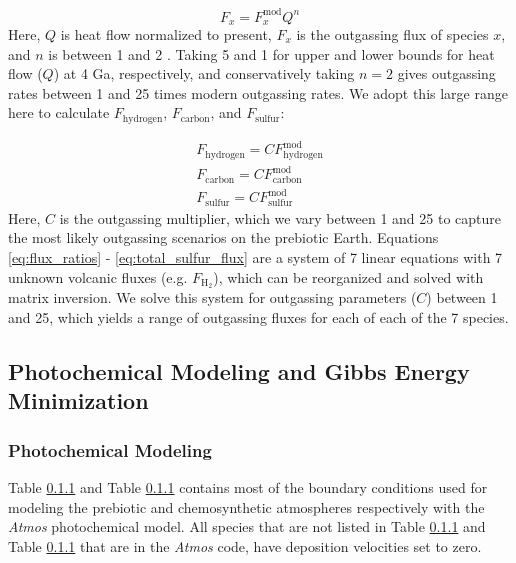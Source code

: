 \begin{equation}
  F_x = F_x^\mathrm{mod} Q^n
\end{equation}
Here, $Q$ is heat flow normalized to present, $F_x$ is the outgassing flux of species $x$, and $n$ is between 1 and 2 \citep{KrissansenTotton_2018_carbon}. Taking 5 and 1 for upper and lower bounds for heat flow ($Q$) at 4 Ga, respectively, and conservatively taking $n = 2$ gives outgassing rates between 1 and 25 times modern outgassing rates. We adopt this large range here to calculate $F_\mathrm{hydrogen}$, $F_\mathrm{carbon}$, and $F_\mathrm{sulfur}$:

\begin{gather}
  F_\mathrm{hydrogen} = C F_\mathrm{hydrogen}^\mathrm{mod} \\
  F_\mathrm{carbon} = C F_\mathrm{carbon}^\mathrm{mod} \\
  F_\mathrm{sulfur} = C F_\mathrm{sulfur}^\mathrm{mod}
\end{gather}
Here, $C$ is the outgassing multiplier, which we vary between 1 and 25 to capture the most likely outgassing scenarios on the prebiotic Earth. Equations \eqref{eq:flux_ratios} - \eqref{eq:total_sulfur_flux} are a system of 7 linear equations with 7 unknown volcanic fluxes (e.g. $F_\mathrm{H_2}$), which can be reorganized and solved with matrix inversion. We solve this system for outgassing parameters ($C$) between 1 and 25, which yields a range of outgassing fluxes for each of each of the 7 species.

\subsection{Photochemical Modeling and Gibbs Energy Minimization}

\subsubsection{Photochemical Modeling}

Table \ref{} and Table \ref{} %
contains most of the boundary conditions used for modeling the prebiotic and chemosynthetic atmospheres respectively with the \textit{Atmos} photochemical model. All species that are not listed in 
Table \ref{} and Table \ref{} %
that are in the \textit{Atmos} code, have deposition velocities set to zero.
